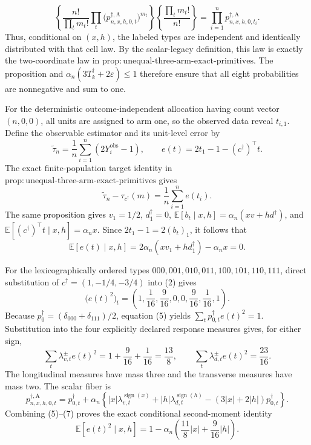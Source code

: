 \[
\left\{\frac{n!}{\prod_t m_t!}
       \prod_t\bigl(p_{n,x,h,0,t}^{\dagger,\mathrm A}\bigr)^{m_t}\right\}
\left\{\frac{\prod_t m_t!}{n!}\right\}
=\prod_{i=1}^n p_{n,x,h,0,t_i}^{\dagger,\mathrm A}.
\tag{1}
\]
Thus, conditional on \((x,h)\), the labeled types are independent and identically distributed with that cell law.  By the scalar-legacy definition, this law is exactly the two-coordinate law in \(\mathrm{prop:unequal\text{-}three\text{-}arm\text{-}exact\text{-}primitives}\).  The proposition and
\(\alpha_n(3T_k^\dagger+2\varepsilon)\leq1\) therefore ensure that all eight probabilities are nonnegative and sum to one.

For the deterministic outcome-independent allocation having count vector \((n,0,0)\), all units are assigned to arm one, so the observed data reveal \(t_{i,1}\).  Define the observable estimator and its unit-level error by
\[
\widetilde\tau_n=\frac1n\sum_{i=1}^n(2Y_i^{\mathrm{obs}}-1),
\qquad
e(t)=2t_1-1-(c^\dagger)^\top t.
\tag{2}
\]
The exact finite-population target identity in
\(\mathrm{prop:unequal\text{-}three\text{-}arm\text{-}exact\text{-}primitives}\) gives
\[
\widetilde\tau_n-\tau_{c^\dagger}(m)
=\frac1n\sum_{i=1}^n e(t_i).
\tag{3}
\]
The same proposition gives \(v_1=1/2\), \(d_1^\dagger=0\),
\(\mathbb E[b_t\mid x,h]=\alpha_n(xv+hd^\dagger)\), and
\(\mathbb E[(c^\dagger)^\top t\mid x,h]=\alpha_nx\).  Since
\(2t_1-1=2(b_t)_1\), it follows that
\[
\mathbb E[e(t)\mid x,h]
=2\alpha_n(xv_1+hd_1^\dagger)-\alpha_nx=0.
\tag{4}
\]

For the lexicographically ordered types
\(000,001,010,011,100,101,110,111\), direct substitution of
\(c^\dagger=(1,-1/4,-3/4)\) into (2) gives
\[
\bigl(e(t)^2\bigr)_t
=\left(1,\frac1{16},\frac9{16},0,0,
       \frac9{16},\frac1{16},1\right).
\tag{5}
\]
Because \(p_0^\dagger=(\delta_{000}+\delta_{111})/2\), equation (5) yields
\(\sum_t p_{0,t}^\dagger e(t)^2=1\).  Substitution into the four explicitly declared response measures gives, for either sign,
\[
\sum_t\lambda_{v,t}^{\pm}e(t)^2
=1+\frac9{16}+\frac1{16}=\frac{13}{8},
\qquad
\sum_t\lambda_{d,t}^{\pm}e(t)^2
=\frac{23}{16}.
\tag{6}
\]
The longitudinal measures have mass three and the transverse measures have mass two.  The scalar fiber is
\[
p_{n,x,h,0,t}^{\dagger,\mathrm A}
=p_{0,t}^\dagger+\alpha_n\left\{
|x|\lambda_{v,t}^{\operatorname{sign}(x)}
+|h|\lambda_{d,t}^{\operatorname{sign}(h)}
-(3|x|+2|h|)p_{0,t}^\dagger\right\}.
\tag{7}
\]
Combining (5)--(7) proves the exact conditional second-moment identity
\[
\mathbb E[e(t)^2\mid x,h]
=1-\alpha_n\left(\frac{11}{8}|x|+
                         \frac9{16}|h|\right).
\tag{8}
\]


